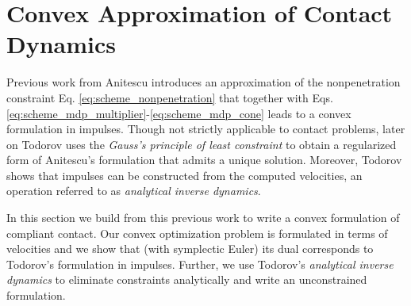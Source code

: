 \section{Convex Approximation of Contact Dynamics}
\label{sec:convex_approximation}

Previous work from Anitescu \cite{bib:anitescu2006} introduces an approximation
of the nonpenetration constraint Eq. \eqref{eq:scheme_nonpenetration} that
together with Eqs. \eqref{eq:scheme_mdp_multiplier}-\eqref{eq:scheme_mdp_cone}
leads to a convex formulation in impulses. Though not strictly applicable to
contact problems, later on Todorov \cite{bib:todorov2011, bib:todorov2014} uses
the \emph{Gauss's principle of least constraint} to obtain a regularized form of
Anitescu's formulation that admits a unique solution. Moreover, Todorov shows
that impulses can be constructed from the computed velocities, an operation
referred to as \textit{analytical inverse dynamics}.

In this section we build from this previous work to write a convex formulation
of compliant contact. Our convex optimization problem is formulated in terms of
velocities and we show that (with symplectic Euler) its dual corresponds to
Todorov's \cite{bib:todorov2014} formulation in impulses. Further, we use
Todorov's \textit{analytical inverse dynamics} to eliminate constraints
analytically and write an unconstrained formulation.




